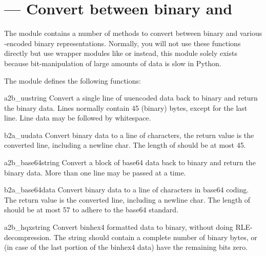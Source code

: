 \section{ ---
         Convert between binary and \ASCII{}}



The  module contains a number of methods to convert
between binary and various \ASCII{}-encoded binary
representations. Normally, you will not use these functions directly
but use wrapper modules like  or
 instead, this module solely
exists because bit-manipulation of large amounts of data is slow in
Python.

The  module defines the following functions:

\begin{funcdesc}{a2b_uu}{string}
Convert a single line of uuencoded data back to binary and return the
binary data. Lines normally contain 45 (binary) bytes, except for the
last line. Line data may be followed by whitespace.
\end{funcdesc}

\begin{funcdesc}{b2a_uu}{data}
Convert binary data to a line of \ASCII{} characters, the return value
is the converted line, including a newline char. The length of
 should be at most 45.
\end{funcdesc}

\begin{funcdesc}{a2b_base64}{string}
Convert a block of base64 data back to binary and return the
binary data. More than one line may be passed at a time.
\end{funcdesc}

\begin{funcdesc}{b2a_base64}{data}
Convert binary data to a line of \ASCII{} characters in base64 coding.
The return value is the converted line, including a newline char.
The length of  should be at most 57 to adhere to the base64
standard.
\end{funcdesc}

\begin{funcdesc}{a2b_hqx}{string}
Convert binhex4 formatted \ASCII{} data to binary, without doing
RLE-decompression. The string should contain a complete number of
binary bytes, or (in case of the last portion of the binhex4 data)
have the remaining bits zero.
\end{funcdesc}

